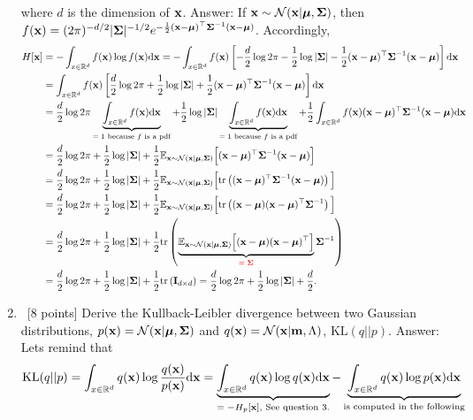 \documentclass[12pt, fullpage,letterpaper]{article}
\def\red{\color{red}}
\def\blackblue{\color{black!40!blue}}
\begin{document}
\begin{enumerate}
\[\]
where $d$ is the dimension of ${\bf x}$.
{\red Answer: }{\blackblue  
If ${\bf x} \sim \mathcal{N}({\bf x}|\boldsymbol{\mu}, \boldsymbol{\Sigma})$, then $f({\bf x}) = (2\pi)^{-d/2}|\boldsymbol{\Sigma}|^{-1/2}e^{-\frac{1}{2}({\bf x}-\boldsymbol{\mu})^\top\boldsymbol{\Sigma}^{-1}({\bf x}-\boldsymbol{\mu})}$.
Accordingly,
\begin{align*}
H[\x] &= -\int_{x\in \mathbb{R}^d} f(\x)\log f(\x) \d \x = -\int_{x\in \mathbb{R}^d} f(\x)\left[-\frac{d}{2}\log 2\pi -\frac12\log|\bSigma| -\frac{1}{2}(\x-\bmu)^\top\bSigma^{-1}(\x-\bmu)\right] \d \x \\
& = \int_{x\in \mathbb{R}^d} f(\x)\left[\frac{d}{2}\log 2\pi +\frac12\log|\bSigma| +\frac{1}{2}(\x-\bmu)^\top\bSigma^{-1}(\x-\bmu)\right] \d \x \\
& = \frac{d}{2}\log 2\pi \underbrace{\int_{x\in \mathbb{R}^d} f(\x)\d\x}_\text{$=1$ because $f$ is a pdf} +\frac12\log|\bSigma| \underbrace{\int_{x\in \mathbb{R}^d} f(\x)\d\x}_\text{$=1$ because $f$ is a pdf} + \frac{1}{2}\int_{x\in \mathbb{R}^d} f(\x)(\x-\bmu)^\top\bSigma^{-1}(\x-\bmu) \d \x \\
& = \frac{d}{2}\log 2\pi +\frac12\log|\bSigma| + \frac{1}{2}\EE_{\x \sim \N(\x|\bmu, \bSigma)}\Big[(\x-\bmu)^\top\bSigma^{-1}(\x-\bmu)\Big] \\
& = \frac{d}{2}\log 2\pi +\frac12\log|\bSigma| + \frac{1}{2}\EE_{\x \sim \N(\x|\bmu, \bSigma)}\Big[\tr \left((\x-\bmu)^\top\bSigma^{-1}(\x-\bmu)\right)\Big] \\
& = \frac{d}{2}\log 2\pi +\frac12\log|\bSigma| + \frac{1}{2}\EE_{\x \sim \N(\x|\bmu, \bSigma)}\Big[\tr \left((\x-\bmu)(\x-\bmu)^\top\bSigma^{-1}\right)\Big] \\
& = \frac{d}{2}\log 2\pi +\frac12\log|\bSigma| + \frac{1}{2}\tr \left(\underbrace{\EE_{\x \sim \N(\x|\bmu, \bSigma)}\Big[(\x-\bmu)(\x-\bmu)^\top\Big]}_\text{\red $=\bSigma$}\bSigma^{-1}\right) \\
& = \frac{d}{2}\log 2\pi +\frac12\log|\bSigma| + \frac{1}{2}\tr \left(\I_{d\times d}\right) 
 = \frac{d}{2}\log 2\pi +\frac12\log|\bSigma| + \frac{d}{2}.
\end{align*}}
\vspace{-.5cm}
\item~[8 points] Derive the Kullback-Leibler divergence between two Gaussian distributions, $p({\bf x}) = \mathcal{N}({\bf x}|\boldsymbol{\mu}, \boldsymbol{\Sigma})$ and $q({\bf x}) = \mathcal{N}({\bf x}|{\bf m}, \Lambda)$, \ie $\mathrm{KL}(q || p)$.
{\red Answer: }{\blackblue Lets remind that 
\begin{align*}
\mathrm{KL}(q || p) 
& = \int_{x\in\mathbb{R}^d} q(\x)\log\frac{q(\x)}{p(\x)}\d\x = \underbrace{\int_{x\in\mathbb{R}^d} q(\x)\log q(\x)\d\x}_\text{$= -H_p[\x]$, See question 3.} - \underbrace{\int_{x\in\mathbb{R}^d} q(\x)\log p(\x) \d\x}_\text{is computed in the following}\\

\end{align*}}
\end{enumerate}
\end{document}
